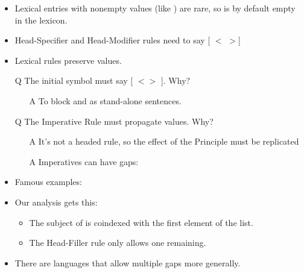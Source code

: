\documentclass[a4paper,landscape,headrule,footrule]{foils}
\begin{document}

\begin{itemize}
\item Lexical entries with nonempty 
values (like ) are rare, so  is by
default empty in the lexicon.
\item Head-Specifier and Head-Modifier rules need to
say [ $<$ $>$]
\item Lexical rules preserve  values.
\end{itemize}

\begin{itemize}
\item[Q] The initial symbol must say [ $< >$ ]. Why?
  \begin{itemize}
  \item[A] To block  and  as
    stand-alone sentences.
  \end{itemize}
\item[Q] The Imperative Rule must propagate  values.
  Why?
  \begin{itemize}
  \item[A] It's not a headed rule, so the effect of the 
    Principle must be replicated
  \item [A] Imperatives can have gaps:
    \\ 
  \end{itemize}
\end{itemize}

\begin{itemize}
\item Famous examples:
  \begin{exe}
    \ex {}
    \ex {}
  \end{exe}
\item Our analysis gets this:
  \begin{itemize}
  \item The subject of  is coindexed with the first
    element of the  list.
  \item The Head-Filler rule only allows one 
    remaining.
  \end{itemize}
\item There are languages that allow multiple gaps more
generally.
\end{itemize}
\end{document}
